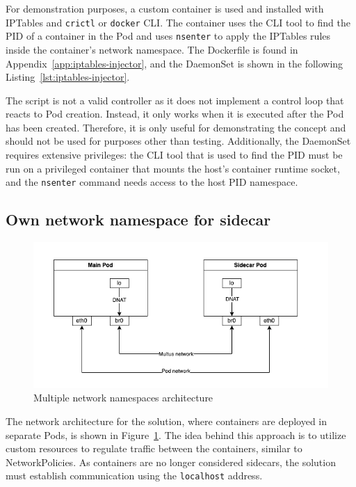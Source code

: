 \documentclass[english, 12pt, a4paper, sci, utf8, a-2b, online]{aaltothesis}
\begin{document}
For demonstration purposes, a custom container is used and installed with IPTables and \lstinline{crictl} or \lstinline{docker} CLI.
The container uses the CLI tool to find the PID of a container in the Pod and uses \lstinline{nsenter} to apply the IPTables rules inside the container's network namespace.
The Dockerfile is found in Appendix~\ref{app:iptables-injector}, and the DaemonSet is shown in the following Listing~\ref{lst:iptables-injector}.



The script is not a valid controller as it does not implement a control loop that reacts to Pod creation.
Instead, it only works when it is executed after the Pod has been created.
Therefore, it is only useful for demonstrating the concept and should not be used for purposes other than testing.
Additionally, the DaemonSet requires extensive privileges: the CLI tool that is used to find the PID must be run on a privileged container that mounts the host's container runtime socket, and the \lstinline{nsenter} command needs access to the host PID namespace.

\subsection{Own network namespace for sidecar}

\begin{figure}[h!]
  \centering
  \includegraphics[width=\linewidth]{files/multus.png}
  \caption{Multiple network namespaces architecture}
  \label{fig:multi-pod-net-solution}
\end{figure}

The network architecture for the solution, where containers are deployed in separate Pods, is shown in Figure~\ref{fig:multi-pod-net-solution}.
The idea behind this approach is to utilize custom resources to regulate traffic between the containers, similar to NetworkPolicies.
As containers are no longer considered sidecars, the solution must establish communication using the \lstinline{localhost} address.
\end{document}
